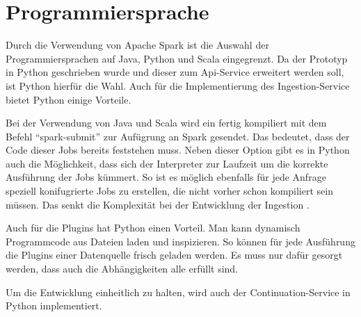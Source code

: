 \section{Programmiersprache}

Durch die Verwendung von Apache Spark ist die Auswahl der Programmiersprachen auf Java, Python und Scala eingegrenzt.
Da der Prototyp in Python geschrieben wurde und dieser zum Api-Service erweitert werden soll, ist Python hierfür die Wahl.
Auch für die Implementierung des Ingestion-Service bietet Python einige Vorteile.


Bei der Verwendung von Java und Scala wird ein fertig kompiliert mit dem Befehl "`spark-submit"' zur Aufügrung an Spark gesendet.
Das bedeutet, dass der Code dieser Jobs bereits feststehen muss.
Neben dieser Option gibt es in Python auch die Möglichkeit, dass sich der Interpreter zur Laufzeit um die korrekte Ausführung der Jobs kümmert.
So ist es möglich ebenfalls für jede Anfrage speziell konifugrierte Jobs zu erstellen, die nicht vorher schon kompiliert sein müssen.
Das senkt die Komplexität bei der Entwicklung der Ingestion \parencite{pyspark-int}.

Auch für die Plugins hat Python einen Vorteil.
Man kann dynamisch Programmcode aus Dateien laden und inspizieren.
So können für jede Ausführung die Plugins einer Datenquelle frisch geladen werden.
Es muss nur dafür gesorgt werden, dass auch die Abhängigkeiten alle erfüllt sind.

Um die Entwicklung einheitlich zu halten, wird auch der Continuation-Service in Python implementiert.